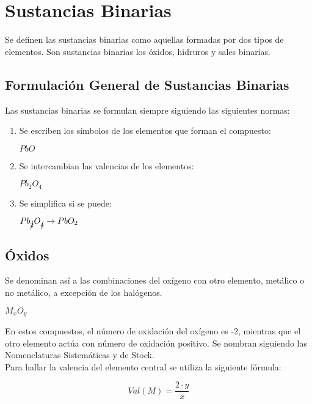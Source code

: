 \section{Sustancias Binarias}
	Se definen las sustancias binarias como aquellas formadas por dos tipos de elementos. Son sustancias binarias los óxidos, hidruros y sales binarias.

\subsection{Formulación General de Sustancias Binarias}
	Las sustancias binarias se formulan siempre siguiendo las siguientes normas:\\
\begin{enumerate}
	\item Se escriben los símbolos de los elementos que forman el compuesto:\\
\begin{center}
		$PbO$
\end{center}
		\item Se intercambian las valencias de los elementos:\\
\begin{center}
	$Pb_{2}O_4$
\end{center}
		\item Se simplifica si se puede:\\
\begin{center}
	$Pb_{\cancel{2}}O_{\cancel{4}} \rightarrow PbO_2$
\end{center}
\end{enumerate}
\subsection {Óxidos}
Se denominan así a las combinaciones del oxígeno con otro elemento, metálico o no metálico, a excepción de los halógenos.\\

\begin{center}
	$M_{x}O_y$
\end{center}

En estos compuestos, el número de oxidación del oxígeno es -2, mientras que el otro elemento actúa con número de oxidación positivo. Se nombran siguiendo las Nomenclaturas Sistemáticas y de Stock.\\ 

Para hallar la valencia del elemento central se utiliza la siguiente fórmula:

\begin{equation}
	Val(M)= \frac{2\cdot y}{x}
\end{equation}

